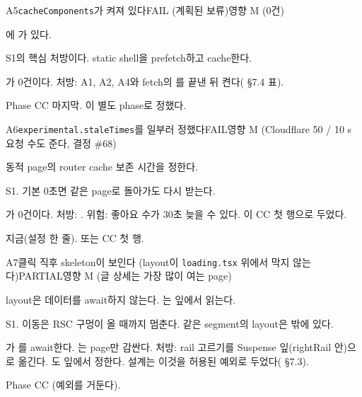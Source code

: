 \begin{checkitem}{\ckopen}{A5}{\texttt{cacheComponents}가 켜져 있다}{FAIL (계획된 보류)\ckdot{}영향 M (0건)}
  \item[What] 에 가 있다.
  \item[Why] S1의 핵심 처방이다. static shell을 prefetch하고 cache한다.
  \item[How] 가 0건이다. 처방: A1, A2, A4와 fetch의 를 끝낸 뒤 켠다( \S7.4 표).
  \item[When] Phase CC 마지막. 이 별도 phase로 정했다.
\end{checkitem}

\begin{checkitem}{\ckopen}{A6}{\texttt{experimental.staleTimes}를 일부러 정했다}{FAIL\ckdot{}영향 M (Cloudflare 50 / 10 s 요청 수도 준다, 결정 \#68)}
  \item[What] 동적 page의 router cache 보존 시간을 정한다.
  \item[Why] S1. 기본 0초면 같은 page로 돌아가도 다시 받는다.
  \item[How] 가 0건이다. 처방: . 위험: 좋아요 수가 30초 늦을 수 있다. 이 CC 첫 행으로 두었다.
  \item[When] 지금(설정 한 줄). 또는 CC 첫 행.
\end{checkitem}

\begin{checkitem}{\ckopen}{A7}{클릭 직후 skeleton이 보인다 (layout이 \texttt{loading.tsx} 위에서 막지 않는다)}{PARTIAL\ckdot{}영향 M (글 상세는 가장 많이 여는 page)}
  \item[What] layout은 데이터를 await하지 않는다. 는 잎에서 읽는다.
  \item[Why] S1. 이동은 RSC 구멍이 올 때까지 멈춘다. 같은 segment의 layout은  밖에 있다.
  \item[How] 가 를 await한다. 는 page만 감싼다. 처방: rail 고르기를 Suspense 잎(rightRail 안)으로 옮긴다. 도 잎에서 정한다. 설계는 이것을 허용된 예외로 두었다( \S7.3).
  \item[When] Phase CC (예외를 거둔다).
\end{checkitem}

